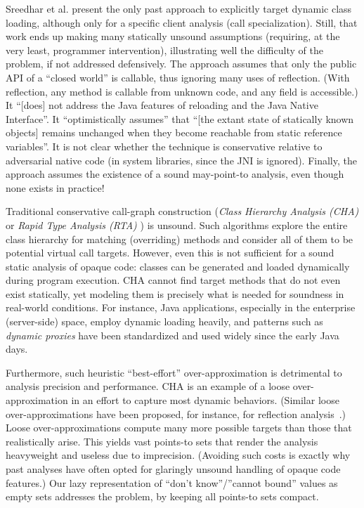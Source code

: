 Sreedhar et al. \cite{pldi:2000:Sreedhar} present the only past approach to explicitly target dynamic class loading, although only for a specific client analysis (call specialization). Still, that work ends up making many statically unsound assumptions (requiring, at the very least, programmer intervention), illustrating well the difficulty of the problem, if not addressed defensively. The approach assumes that only the public API of a ``closed world'' is callable, thus ignoring many uses of reflection. (With reflection, any method is callable from unknown code, and any field is accessible.) It ``[does] not address the Java features of reloading and the Java Native Interface''. It ``optimistically assumes'' that ``[the extant state of statically known objects] remains unchanged when they become reachable from static reference variables''. It is not clear whether the technique is conservative relative to adversarial native code (in system libraries, since the JNI is ignored). Finally, the approach assumes the existence of a sound may-point-to analysis, even though none exists in practice!

Traditional conservative call-graph construction (\emph{Class Hierarchy Analysis (CHA)} \cite{ecoop:1995:Dean} or \emph{Rapid Type Analysis (RTA)} \cite{oopsla:1996:Bacon}) is unsound. Such algorithms explore the entire class hierarchy for matching (overriding) methods and consider all of them to be potential virtual call targets. However, even this is not sufficient for a sound static analysis of opaque code: classes can be generated and loaded dynamically during program execution. CHA cannot find target methods that do not even exist statically, yet modeling them is precisely what is needed for soundness in real-world conditions. For instance, Java applications, especially in the enterprise (server-side) space, employ dynamic loading heavily, and patterns such as \emph{dynamic proxies} have been standardized and used widely since the early Java days.

Furthermore, such heuristic ``best-effort'' over-approximation is detrimental to analysis precision and performance. CHA is an example of a loose over-approximation in an effort to capture most dynamic behaviors.
(Similar loose over-approximations have been proposed, for instance, for reflection analysis~\cite{aplas:2015:Smaragdakis}.) Loose over-approximations compute many more possible targets than those that realistically arise. This yields vast points-to sets that render the analysis heavyweight and useless due to imprecision. (Avoiding such costs is exactly why past analyses have often opted for glaringly unsound handling of opaque code features.) Our lazy representation of ``don't know''/''cannot bound'' values as empty sets addresses the problem, by keeping all points-to sets compact.

